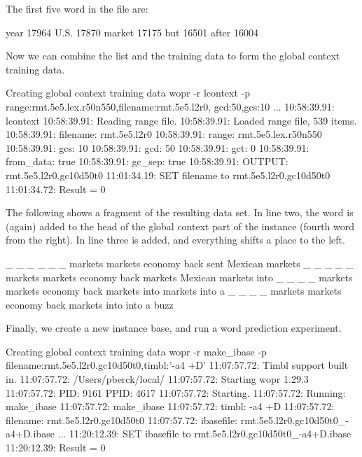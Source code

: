 \documentclass[a4paper,10pt,twoside]{report}
\begin{document}
The first five word in the file are:

\begin{wout}{}
year 17964
U.S. 17870
market 17175
but 16501
after 16004
\end{wout}

Now we can combine the list and the training data to form the global
context training data.

\begin{bash}{Creating global context training data}
wopr -r lcontext -p range:rmt.5e5.lex.r50n550,filename:rmt.5e5.l2r0,
                    gcd:50,gcs:10
...
10:58:39.91: lcontext
10:58:39.91: Reading range file.
10:58:39.91: Loaded range file, 539 items.
10:58:39.91:  filename:  rmt.5e5.l2r0
10:58:39.91:  range:     rmt.5e5.lex.r50n550
10:58:39.91:  gcs:       10
10:58:39.91:  gcd:       50
10:58:39.91:  gct:       0
10:58:39.91:  from_data: true
10:58:39.91:  gc_sep:    true
10:58:39.91:  OUTPUT:    rmt.5e5.l2r0.gc10d50t0
11:01:34.19: SET filename to rmt.5e5.l2r0.gc10d50t0
11:01:34.72: Result = 0
\end{bash}

The following shows a fragment of the resulting data set. In line two,
the word  is (again) added to the head of the global context
part of the instance (fourth word from the right). In line three 
is added, and everything shifts a place to the left.

\begin{wout}{}
_ _ _ _ _ _ markets markets economy back sent Mexican markets
_ _ _ _ _ markets markets economy back markets Mexican markets into
_ _ _ _ markets markets economy back markets into markets into a
_ _ _ _ markets markets economy back markets into into a buzz
\end{wout}

Finally, we create a new instance base, and run a word prediction
experiment.

\begin{bash}{Creating global context training data}
wopr -r make_ibase -p filename:rmt.5e5.l2r0.gc10d50t0,timbl:'-a4 +D'
11:07:57.72: Timbl support built in.
11:07:57.72: /Users/pberck/local/
11:07:57.72: Starting wopr 1.29.3
11:07:57.72: PID:   9161 PPID:   4617
11:07:57.72: Starting.
11:07:57.72: Running: make_ibase
11:07:57.72: make_ibase
11:07:57.72:  timbl:     -a4 +D
11:07:57.72:  filename:  rmt.5e5.l2r0.gc10d50t0
11:07:57.72:  ibasefile: rmt.5e5.l2r0.gc10d50t0_-a4+D.ibase
...
11:20:12.39: SET ibasefile to rmt.5e5.l2r0.gc10d50t0_-a4+D.ibase
11:20:12.39: Result = 0
\end{bash}
\end{document}
